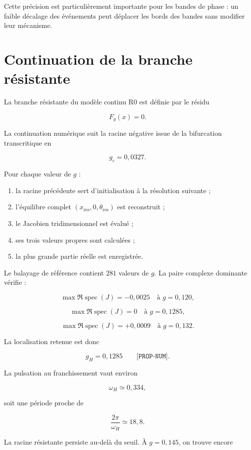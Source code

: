 Cette précision est particulièrement importante pour les bandes de
phase : un faible décalage des événements peut déplacer les bords des
bandes sans modifier leur mécanisme.

\section{Continuation de la branche résistante}
\label{annexe-num-continuation-resistance}

La branche résistante du modèle continu R0 est définie par le résidu

\[
F_g(x)=0.
\]

La continuation numérique suit la racine négative issue de la
bifurcation transcritique en

\[
g_c=0{,}0327.
\]

Pour chaque valeur de \(g\) :

\begin{enumerate}
\item la racine précédente sert d'initialisation à la résolution suivante ;
\item l'équilibre complet \((x_{\mathrm{res}},0,\theta_{\mathrm{res}})\) est reconstruit ;
\item le Jacobien tridimensionnel est évalué ;
\item ses trois valeurs propres sont calculées ;
\item la plus grande partie réelle est enregistrée.
\end{enumerate}

Le balayage de référence contient \(281\) valeurs de \(g\). La paire
complexe dominante vérifie :

\[
\max\Re\operatorname{spec}(J)
=
-0{,}0025
\quad
\text{à }g=0{,}120,
\]

\[
\max\Re\operatorname{spec}(J)
=
0
\quad
\text{à }g=0{,}1285,
\]

\[
\max\Re\operatorname{spec}(J)
=
+0{,}0009
\quad
\text{à }g=0{,}132.
\]

La localisation retenue est donc

\[
\boxed{g_H=0{,}1285}
\qquad
\texttt{[PROP-NUM]}.
\]

La pulsation au franchissement vaut environ

\[
\omega_H\simeq0{,}334,
\]

soit une période proche de

\[
\frac{2\pi}{\omega_H}\simeq18{,}8.
\]

La racine résistante persiste au-delà du seuil. À \(g=0{,}145\), on
trouve encore

